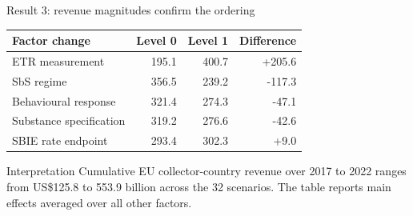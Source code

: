 \documentclass[aspectratio=169, 11pt]{beamer}
\newcommand{\USD}{US\$}
\begin{document}
\begin{frame}{Result 3: revenue magnitudes confirm the ordering}
\begin{center}
\small
\begin{tabular}{@{}lrrr@{}}
  \toprule
  Factor change & Level 0 & Level 1 & Difference \\
  \midrule
  ETR measurement & 195.1 & 400.7 & +205.6 \\
  SbS regime & 356.5 & 239.2 & -117.3 \\
  Behavioural response & 321.4 & 274.3 & -47.1 \\
  Substance specification & 319.2 & 276.6 & -42.6 \\
  SBIE rate endpoint & 293.4 & 302.3 & +9.0 \\
  \bottomrule
\end{tabular}
\end{center}

\vspace{0.6em}
\begin{block}{Interpretation}
  Cumulative EU collector-country revenue over 2017 to 2022 ranges from \USD125.8 to 553.9 billion across the 32 scenarios. The table reports main effects averaged over all other factors.
\end{block}
\end{frame}
\end{document}
